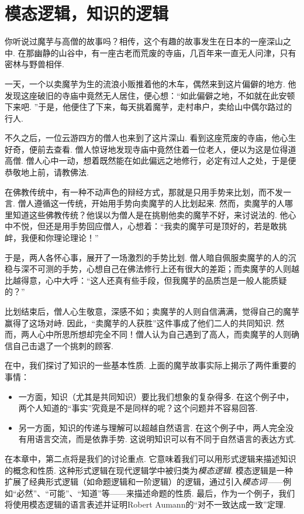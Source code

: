 \chapter{模态逻辑，知识的逻辑}\label{chap:modal-logic}

你听说过魔芋与高僧的故事吗？相传，这个有趣的故事发生在日本的一座深山之中. 在那幽静的山谷中，有一座古老而荒废的寺庙，几百年来一直无人问津，只有密林与野兽相伴. 

一天，一个以卖魔芋为生的流浪小贩推着他的木车，偶然来到这片偏僻的地方. 他发现这座破旧的寺庙中竟然无人居住，便心想：“如此偏僻之地，不如就在此安顿下来吧. ”于是，他便住了下来，每天挑着魔芋，走村串户，卖给山中偶尔路过的行人. 

不久之后，一位云游四方的僧人也来到了这片深山. 看到这座荒废的寺庙，他心生好奇，便前去查看. 僧人惊讶地发现寺庙中竟然住着一位老人，便以为这是位得道高僧. 僧人心中一动，想着既然能在如此偏远之地修行，必定有过人之处，于是便恭敬地上前，请教佛法. 

在佛教传统中，有一种不动声色的辩经方式，那就是只用手势来比划，而不发一言. 僧人遵循这一传统，开始用手势向卖魔芋的人比划起来. 然而，卖魔芋的人哪里知道这些佛教传统？他误以为僧人是在挑剔他卖的魔芋不好，来讨说法的. 他心中不悦，但还是用手势回应僧人，心想着：“我卖的魔芋可是顶好的，若是敢挑衅，我便和你理论理论！”

于是，两人各怀心事，展开了一场激烈的手势比划. 僧人暗自佩服卖魔芋的人的沉稳与深不可测的手势，心想自己在佛法修行上还有很大的差距；而卖魔芋的人则越比越得意，心中大呼：“这人还真有些手段，但我魔芋的品质岂是一般人能质疑的？”

比划结束后，僧人心生敬意，深感不如；卖魔芋的人则自信满满，觉得自己的魔芋赢得了这场对峙. 因此，“卖魔芋的人获胜”这件事成了他们二人的共同知识. 然而，两人心中所思所想却完全不同！僧人认为自己遇到了高人，而卖魔芋的人则确信自己击退了一个挑刺的顾客. 

在中，我们探讨了知识的一些基本性质. 上面的魔芋故事实际上揭示了两件重要的事情：
\begin{itemize}
    \item 一方面，知识（尤其是共同知识）要比我们想象的复杂得多. 在这个例子中，两个人知道的“事实”究竟是不是同样的呢？这个问题并不容易回答. 
    \item 另一方面，知识的传递与理解可以超越自然语言. 在这个例子中，两人完全没有用语言交流，而是依靠手势. 这说明知识可以有不同于自然语言的表达方式. 
\end{itemize}

在本章中，第二点将是我们的讨论重点. 它意味着我们可以用形式逻辑来描述知识的概念和性质. 这种形式逻辑在现代逻辑学中被归类为\textit{模态逻辑}. 模态逻辑是一种扩展了经典形式逻辑（如命题逻辑和一阶逻辑）的逻辑，通过引入\textit{模态词}——例如“必然”、“可能”、“知道”等——来描述命题的性质. 最后，作为一个例子，我们将使用模态逻辑的语言表述并证明Robert Aumann的“对不一致达成一致”定理. 

